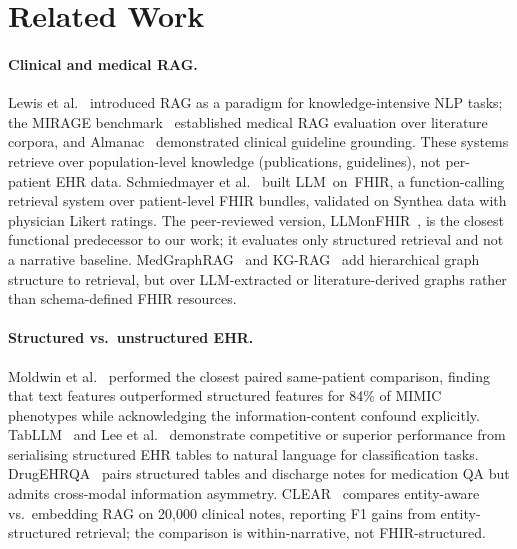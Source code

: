 \section{Related Work}
\label{sec:related}

\paragraph{Clinical and medical RAG.}
Lewis et al.~\citep{lewis2020retrieval} introduced RAG as a paradigm for knowledge-intensive
NLP tasks; the MIRAGE benchmark~\citep{xiong2024benchmarking} established medical RAG evaluation
over literature corpora, and Almanac~\citep{zakka2024almanac} demonstrated clinical guideline
grounding.  These systems retrieve over population-level knowledge (publications,
guidelines), not per-patient EHR data.  Schmiedmayer et al.~\citep{schmiedmayer2024llmonfhir}
built LLM~on~FHIR, a function-calling retrieval system over patient-level FHIR bundles,
validated on Synthea data with physician Likert ratings.  The peer-reviewed version,
LLMonFHIR~\citep{schmiedmayer2025llmonfhir}, is the closest functional predecessor to our
work; it evaluates only structured retrieval and not a narrative baseline.
MedGraphRAG~\citep{wu2024medgraphrag} and KG-RAG~\citep{soman2024biomedical} add
hierarchical graph structure to retrieval, but over LLM-extracted or literature-derived graphs
rather than schema-defined FHIR resources.

\paragraph{Structured vs.\ unstructured EHR.}
Moldwin et al.~\citep{moldwin2021empirical} performed the closest paired same-patient
comparison, finding that text features outperformed structured features for 84\% of
MIMIC phenotypes while acknowledging the information-content confound explicitly.  TabLLM~\citep{hegselmann2023tabllm}
and Lee et al.~\citep{lee2025pseudonotes} demonstrate competitive or superior performance from
serialising structured EHR tables to natural language for classification tasks.  DrugEHRQA~\citep{bardhan2022drugehrqa}
pairs structured tables and discharge notes for medication QA but admits cross-modal
information asymmetry.  CLEAR~\citep{lopez2025clinical} compares entity-aware vs.\ embedding
RAG on 20,000 clinical notes, reporting F1 gains from entity-structured retrieval; the
comparison is within-narrative, not FHIR-structured.

